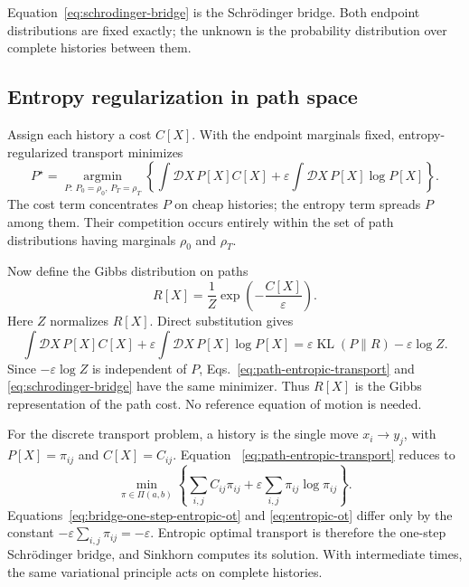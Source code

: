 \documentclass[11pt]{article}
\newcommand{\KL}{\operatorname{KL}}
\begin{document}
Equation~\eqref{eq:schrodinger-bridge} is the Schr\"odinger bridge. Both
endpoint distributions are fixed exactly; the unknown is the probability
distribution over complete histories between them.

\subsection{Entropy regularization in path space}

Assign each history a cost $C[X]$. With the endpoint marginals fixed,
entropy-regularized transport minimizes
\begin{equation}
  P^\star
  =\operatorname*{argmin}_{P:\,P_0=\rho_0,\,P_T=\rho_T}
  \left\{
    \int\mathcal D X\,P[X]C[X]
    +\varepsilon\int\mathcal D X\,P[X]\log P[X]
  \right\}.
  \label{eq:path-entropic-transport}
\end{equation}
The cost term concentrates $P$ on cheap histories; the entropy term spreads
$P$ among them. Their competition occurs entirely within the set of path
distributions having marginals $\rho_0$ and $\rho_T$.

Now define the Gibbs distribution on paths
\begin{equation}
  R[X]=\frac{1}{Z}\exp\!\left(-\frac{C[X]}{\varepsilon}\right).
  \label{eq:path-gibbs-distribution}
\end{equation}
Here $Z$ normalizes $R[X]$.
Direct substitution gives
\begin{equation}
  \int\mathcal D X\,P[X]C[X]
  +\varepsilon\int\mathcal D X\,P[X]\log P[X]
  =\varepsilon\KL(P\|R)-\varepsilon\log Z.
  \label{eq:path-entropy-kl-identity}
\end{equation}
Since $-\varepsilon\log Z$ is independent of $P$,
Eqs.~\eqref{eq:path-entropic-transport} and
\eqref{eq:schrodinger-bridge} have the same minimizer. Thus $R[X]$ is the
Gibbs representation of the path cost. No reference equation of motion is
needed.

For the discrete transport problem, a history is the single move
$x_i\to y_j$, with $P[X]=\pi_{ij}$ and $C[X]=C_{ij}$. Equation
~\eqref{eq:path-entropic-transport} reduces to
\begin{equation}
  \min_{\pi\in\Pi(a,b)}
  \left\{
    \sum_{i,j}C_{ij}\pi_{ij}
    +\varepsilon\sum_{i,j}\pi_{ij}\log\pi_{ij}
  \right\}.
  \label{eq:bridge-one-step-entropic-ot}
\end{equation}
Equations~\eqref{eq:bridge-one-step-entropic-ot} and
\eqref{eq:entropic-ot} differ only by the constant
$-\varepsilon\sum_{i,j}\pi_{ij}=-\varepsilon$. Entropic optimal transport
is therefore the one-step Schr\"odinger bridge, and Sinkhorn computes its
solution. With intermediate times, the same variational principle acts on
complete histories.
\end{document}
